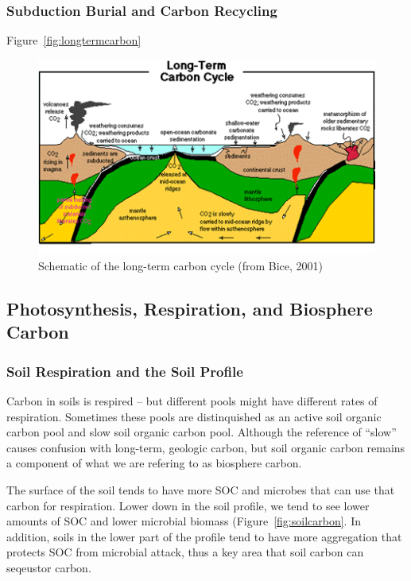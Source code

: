 \documentclass{book}\usepackage{knitr}
\begin{document}
\begin{knitrout}
\begin{kframe}
\subsubsection{Subduction Burial and Carbon Recycling}

Figure~\ref{fig:longtermcarbon}

\begin{figure}
\includegraphics[width=\linewidth]{images/earth-system/long-term-carbon.png}
\caption{Schematic of the long-term carbon cycle (from Bice, 2001)}
\label{longtermcarbon}
\end{figure}

\subsection{Photosynthesis, Respiration, and Biosphere Carbon}

\subsubsection{Soil Respiration and the Soil Profile}

Carbon in soils is respired -- but different pools might have different rates of respiration. Sometimes these pools are distinquished as an active soil organic carbon pool and slow soil organic carbon pool. Although the reference of ``slow'' causes confusion with long-term, geologic carbon, but soil organic carbon remains a component of what we are refering to as biosphere carbon. 

The surface of the soil tends to have more SOC and microbes that can use that carbon for respiration. Lower down in the soil profile, we tend to see lower amounts of SOC and lower microbial biomass (Figure~\ref{fig:soilcarbon}. In addition, soils in the lower part of the profile tend to have more aggregation that protects SOC from microbial attack, thus a key area that soil carbon can seqeustor carbon. 


\end{kframe}
\end{knitrout}
\end{document}
